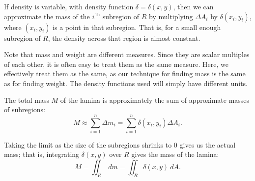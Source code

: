 If density is variable, with density function $\delta= \delta(x,y)$, then we can approximate the mass of the $i^{\,\text{th}}$ subregion of $R$ by multiplying $\Delta A_i$ by $\delta(x_i,y_i)$, where $(x_i,y_i)$ is a point in that subregion. That is, for a small enough subregion of $R$, the density across that region is almost constant. 

Note that mass and weight are different measures. Since they are scalar multiples of each other, it is often easy to treat them as the same measure. Here,  we effectively treat them as the same, as our technique for finding mass is the same as for finding weight. The density functions used will simply have different units.

The total mass $M$ of the lamina is approximately the sum of approximate masses of subregions:
$$M \approx \sum_{i=1}^n \Delta m_i = \sum_{i=1}^n \delta(x_i,y_i)\Delta A_i.$$

Taking the limit as the size of the subregions shrinks to 0 gives us the actual mass; that is, integrating $\delta(x,y)$ over $R$ gives the mass of the lamina:
\begin{equation}
M = \iint_R\ dm = \iint_R \delta(x,y)\ dA.
\label{def:mass}
\end{equation}

